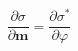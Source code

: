 \begin{equation}
    \frac{\partial \sigma}{\partial \mathbf{m}} = \frac{\partial\sigma^*}{\partial \varphi}
\label{eq:deriv_emt}
\end{equation}
